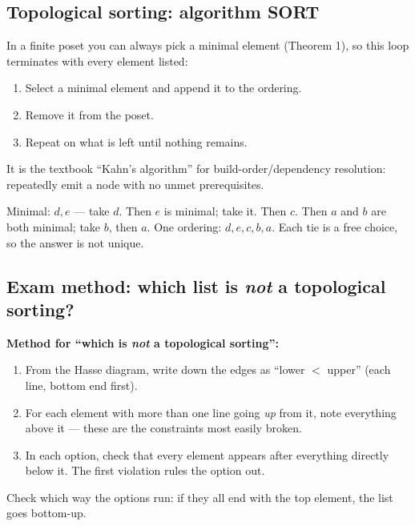 \documentclass{fkt-notes}
\theoremstyle{definition}
\begin{document}
\subsection{Topological sorting: algorithm SORT}
%
In a finite poset you can always pick a minimal element (Theorem 1),
so this loop terminates with every element listed:
\begin{enumerate}
  \item Select a minimal element and append it to the ordering.
  \item Remove it from the poset.
  \item Repeat on what is left until nothing remains.
\end{enumerate}
It is the textbook ``Kahn's algorithm'' for build-order/dependency
resolution: repeatedly emit a node with no unmet prerequisites.

\begin{example}\leavevmode\par\noindent
  \begin{minipage}[c]{0.3\textwidth}
    \centering
  \end{minipage}\hfill
  \begin{minipage}[c]{0.66\textwidth}
    Minimal: $d,e$ --- take $d$. Then $e$ is minimal; take it. Then $c$.
    Then $a$ and $b$ are both minimal; take $b$, then $a$. One ordering:
    $d,e,c,b,a$. Each tie is a free choice, so the answer is not unique.
  \end{minipage}
\end{example}

\subsection{Exam method: which list is \emph{not} a topological sorting?}
%
\textbf{Method for ``which is \emph{not} a topological sorting'':}
\begin{enumerate}[nosep]
  \item From the Hasse diagram, write down the edges as ``lower $<$
        upper'' (each line, bottom end first).
  \item For each element with more than one line going \emph{up} from
        it, note everything above it --- these are the constraints
        most easily broken.
  \item In each option, check that every element appears after
        everything directly below it. The first violation rules the
        option out.
\end{enumerate}
Check which way the options run: if they all end with the top element,
the list goes bottom-up.
\end{document}
